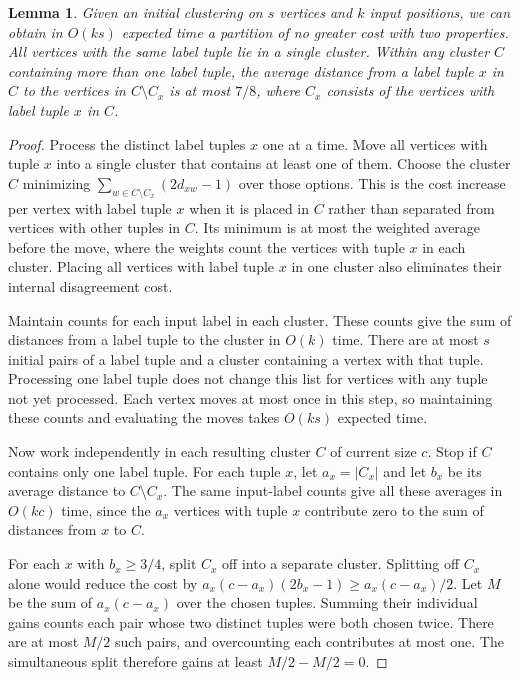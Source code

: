 \documentclass[11pt]{article}
\newtheorem{lemma}[theorem]{Lemma}
\begin{document}
\begin{lemma}
\label{sig:prepare}
Given an initial clustering on $s$ vertices and $k$ input positions, we can obtain
in $O(ks)$ expected time a partition of no greater cost with two
properties. All vertices with the same label tuple lie in a single cluster. Within any cluster
$C$ containing more than one label tuple, the average distance from a
label tuple $x$ in $C$ to the vertices in $C\setminus C_x$ is at most
$7/8$, where $C_x$ consists of the vertices with label tuple $x$ in $C$.
\end{lemma}
\begin{proof}
Process the distinct label tuples $x$ one at a time. Move all vertices with tuple $x$
into a single cluster that contains
at least one of them. Choose the cluster $C$
minimizing $\sum_{w\in C\setminus C_x}(2d_{xw}-1)$ over those options.
This is the cost increase per vertex with label tuple $x$ when it
is placed in $C$ rather than separated from vertices with other tuples
in $C$. Its minimum is at most the
weighted average before the move, where the weights count the vertices with tuple
$x$ in each cluster. Placing all vertices with label tuple $x$ in one cluster also eliminates their
internal disagreement cost.

Maintain counts for each input label in each cluster. These counts give
the sum of distances from a label tuple to the cluster in $O(k)$ time.
There are at most $s$ initial pairs of a label tuple and a cluster containing a vertex with that tuple.
Processing one label tuple does not change this list for vertices with any tuple not yet processed.
Each vertex moves at most once in this step, so maintaining these counts
and evaluating the moves takes $O(ks)$ expected time.

Now work independently in each resulting cluster $C$ of current size
$c$. Stop if $C$ contains only one label tuple. For each tuple $x$, let
$a_x=|C_x|$ and let $b_x$ be its average distance to $C\setminus C_x$.
The same input-label counts give all these averages in $O(kc)$ time,
since the $a_x$ vertices with tuple $x$ contribute zero to the sum of distances
from $x$ to $C$.

For each $x$ with $b_x\ge3/4$, split $C_x$ off into a separate cluster. Splitting
off $C_x$ alone would reduce the cost by
$a_x(c-a_x)(2b_x-1)\ge a_x(c-a_x)/2$. Let $M$ be the sum of
$a_x(c-a_x)$ over the chosen tuples. Summing their individual gains
counts each pair whose two distinct tuples were both chosen twice.
There are at most $M/2$ such pairs, and overcounting each contributes
at most one. The simultaneous split therefore gains at least
$M/2-M/2=0$.


\end{proof}
\end{document}
